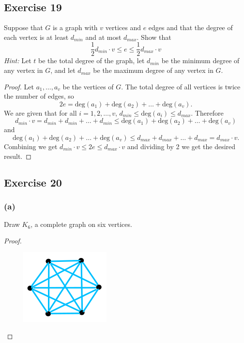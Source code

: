 \documentclass[14pt]{extarticle}
\begin{document}
\subsection{Exercise 19}
Suppose that $G$ is a graph with $v$ vertices and $e$ edges and that the degree of each vertex is at least $d_{min}$ and at most $d_{max}$. Show that
\[
\frac{1}{2}d_{min}\cdot v \leq e \leq \frac{1}{2}d_{max}\cdot v
\]
{\it Hint:} Let $t$ be the total degree of the graph, let $d_{min}$ be the minimum degree of any vertex in $G$, and let $d_{max}$ be the maximum degree of any vertex in $G$.

\begin{proof}
Let $a_1, \ldots, a_v$ be the vertices of $G$. The total degree of all vertices is twice the number of edges, so
\[
2e = \text{deg}(a_1) + \text{deg}(a_2) + \ldots + \text{deg}(a_v).
\]
We are given that for all $i = 1, 2, \ldots, v$, $d_{min} \leq \text{deg}(a_i) \leq d_{max}$. Therefore
\[
d_{min} \cdot v = d_{min} + d_{min} + \ldots + d_{min} \leq \text{deg}(a_1) + \text{deg}(a_2) + \ldots + \text{deg}(a_v)
\]
and
\[
\text{deg}(a_1) + \text{deg}(a_2) + \ldots + \text{deg}(a_v) \leq d_{max} + d_{max} + \ldots + d_{max} = d_{max} \cdot v.
\]
Combining we get $d_{min} \cdot v \leq 2e \leq d_{max} \cdot v$ and dividing by 2 we get the desired result.
\end{proof}

\subsection{Exercise 20}
\subsubsection{(a)}
Draw $K_6$, a complete graph on six vertices.

\begin{proof}
\begin{figure}[ht!]
\centering
\includegraphics[scale=0.5]{../images/4.9.20.png}
\end{figure}
\end{proof}
\end{document}
